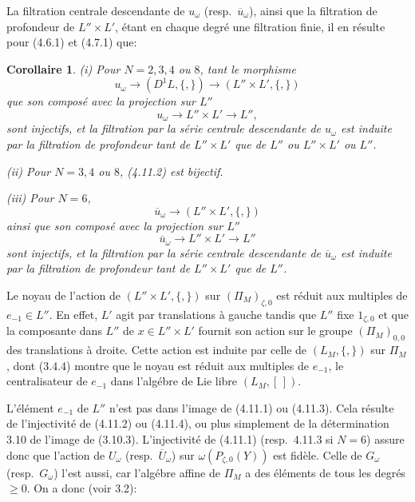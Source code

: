 \documentclass[11pt,a4paper]{article}
\theoremstyle{plain}
\newtheorem{corollary}[theorem]{Corollaire}
\theoremstyle{definition}
\begin{document}
La filtration centrale descendante de $u_\omega$ (resp.~$\overline{u}_\omega$), ainsi que la filtration de profondeur de $L'' \times L'$, \'etant en chaque degr\'e une filtration finie, il en r\'esulte pour (4.6.1) et (4.7.1) que:

\begin{corollary}\label{cor:4.11}
\emph{(i)} Pour $N=2,3,4$ ou $8$, tant le morphisme
\begin{equation}\label{eq:4.11.1}
u_\omega \to (D^1L, \{,\}) \to (L'' \times L', \{,\})
\end{equation}
que son compos\'e avec la projection sur $L''$
\begin{equation}\label{eq:4.11.2}
u_\omega \to L'' \times L' \to L'',
\end{equation}
sont injectifs, et la filtration par la s\'erie centrale descendante de $u_\omega$ est induite par la filtration de profondeur tant de $L'' \times L'$ que de $L''$ ou $L'' \times L'$ ou $L''$.

\emph{(ii)} Pour $N=3,4$ ou $8$, (4.11.2) est bijectif.

\emph{(iii)} Pour $N=6$,
\begin{equation}\label{eq:4.11.3}
\overline{u}_\omega \to (L'' \times L', \{,\})
\end{equation}
ainsi que son compos\'e avec la projection sur $L''$
\begin{equation}\label{eq:4.11.4}
\overline{u}_\omega \to L'' \times L' \to L''
\end{equation}
sont injectifs, et la filtration par la s\'erie centrale descendante de $\overline{u}_\omega$ est induite par la filtration de profondeur tant de $L'' \times L'$ que de $L''$.
\end{corollary}

Le noyau de l'action de $(L'' \times L', \{,\})$ sur $(\Pi_M)_{\zeta,0}$ est r\'eduit aux multiples de $e_{-1} \in L''$. En effet, $L'$ agit par translations \`a gauche tandis que $L''$ fixe $1_{\zeta,0}$ et que la composante dans $L''$ de $x \in L'' \times L'$ fournit son action sur le groupe $(\Pi_M)_{0,0}$ des translations \`a droite. Cette action est induite par celle de $(L_M, \{,\})$ sur $\Pi_M$, dont (3.4.4) montre que le noyau est r\'eduit aux multiples de $e_{-1}$, le centralisateur de $e_{-1}$ dans l'alg\'ebre de Lie libre $(L_M, [\,])$.

L'\'el\'ement $e_{-1}$ de $L''$ n'est pas dans l'image de (4.11.1) ou (4.11.3). Cela r\'esulte de l'injectivit\'e de (4.11.2) ou (4.11.4), ou plus simplement de la d\'etermination 3.10 de l'image de (3.10.3). L'injectivit\'e de (4.11.1) (resp.~4.11.3 si $N=6$) assure donc que l'action de $U_\omega$ (resp.~$\overline{U}_\omega$) sur $\omega(P_{\zeta,0}(Y))$ est fid\`ele. Celle de $G_\omega$ (resp.~$G_\omega$) l'est aussi, car l'alg\'ebre affine de $\Pi_M$ a des \'el\'ements de tous les degr\'es $\geq 0$. On a donc (voir 3.2):
\end{document}
